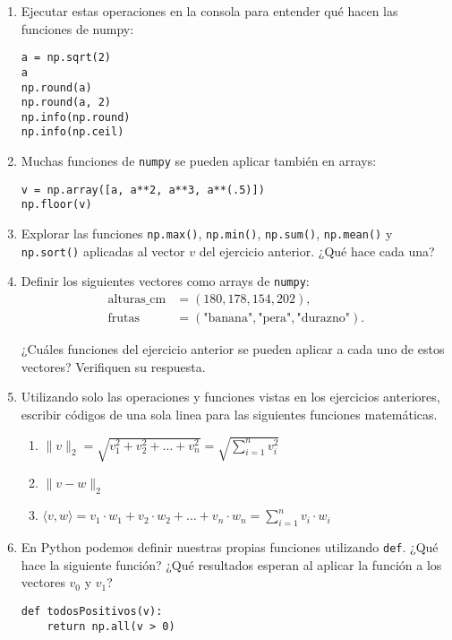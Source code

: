 \documentclass[a4paper,11pt]{article}
\theoremstyle{definition}
\begin{document}
\begin{enumerate}[resume]
\item Ejecutar estas operaciones en la consola para entender qué hacen las funciones de numpy:
\begin{lstlisting}
a = np.sqrt(2)
a
np.round(a)
np.round(a, 2)
np.info(np.round)
np.info(np.ceil)
\end{lstlisting}

\item Muchas funciones de \lstinline{numpy} se pueden aplicar también en arrays:
\begin{lstlisting}
v = np.array([a, a**2, a**3, a**(.5)])
np.floor(v)
\end{lstlisting}

\item Explorar las funciones \lstinline{np.max()}, \lstinline{np.min()}, \lstinline{np.sum()}, \lstinline{np.mean()} y \lstinline{np.sort()} aplicadas al vector $v$ del ejercicio anterior. ¿Qué hace cada una?

\item Definir los siguientes vectores como arrays de \lstinline{numpy}:
\begin{align*}
\text{alturas\_cm} &= (180, 178, 154, 202), \\
\text{frutas} &= (\text{"banana"}, \text{"pera"}, \text{"durazno"}).
\end{align*}

¿Cuáles funciones del ejercicio anterior se pueden aplicar a cada uno de estos vectores? Verifiquen su respuesta.


\item Utilizando solo las operaciones y funciones vistas en los ejercicios anteriores, escribir códigos de una sola linea para las siguientes funciones matemáticas.
\begin{enumerate}
\item $\|v\|_2 = \sqrt{v_1^2 + v_2^2 + \dots + v_n^2} = \sqrt{\sum_{i=1}^n v_i^2}$
\item $\|v - w\|_2$
\item $\langle v, w\rangle = v_1 \cdot w_1 + v_2 \cdot w_2 + \dots + v_n \cdot w_n = \sum_{i=1}^n v_i \cdot w_i$
\end{enumerate}

\item En Python podemos definir nuestras propias funciones utilizando \lstinline{def}. ¿Qué hace la siguiente función? ¿Qué resultados esperan al aplicar la función a los vectores $v_0$ y $v_1$?
\begin{lstlisting}
def todosPositivos(v):
    return np.all(v > 0)



\end{lstlisting}
\end{enumerate}
\end{document}
